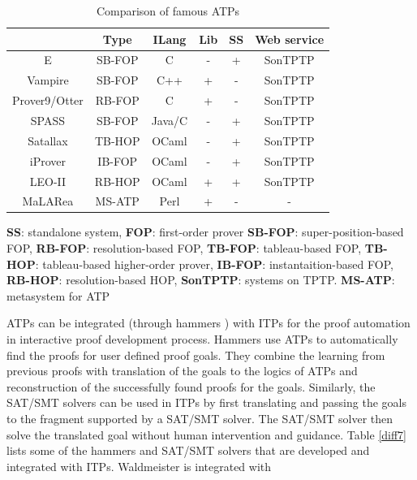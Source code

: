 \begin{table}[!ht]
 \centering
 \begin{threeparttable}
  \caption{Comparison of famous ATPs}\label{diff6}
  \begin{tabular}{|c|c|c|c|c|c|}
    \hline
    {\bf } & {\bf Type} & {\bf ILang} & {\bf Lib} & {\bf SS} & {\bf Web service}\\ \hline
     E & SB-FOP & C & - & + & SonTPTP\\ \hline
     Vampire & SB-FOP & C++ & + & - & SonTPTP\\ \hline    
     Prover9/Otter & RB-FOP & C & + & - & SonTPTP\\ \hline     
     SPASS & SB-FOP & Java/C & - & + & SonTPTP\\ \hline 
     Satallax & TB-HOP  & OCaml & - & + & SonTPTP \\ \hline 
     iProver & IB-FOP & OCaml & - & + & SonTPTP \\ \hline 
     LEO-II & RB-HOP & OCaml & + & + & SonTPTP \\ \hline 
     MaLARea & MS-ATP & Perl & + & - & - \\ \hline 
     \end{tabular}
\begin{tablenotes}
\item 
{\bf SS}: standalone system, {\bf FOP}: first-order prover 
 {\bf SB-FOP}: super-position-based FOP, {\bf RB-FOP}: resolution-based FOP, {\bf TB-FOP}: tableau-based FOP, {\bf TB-HOP}: tableau-based higher-order prover, 
 {\bf IB-FOP}: instantaition-based FOP, {\bf RB-HOP}: resolution-based HOP, {\bf SonTPTP}: systems on TPTP. {\bf MS-ATP}: metasystem for ATP
\end{tablenotes}
\end{threeparttable}
\end{table}
ATPs can be integrated (through hammers ) with ITPs for the proof automation in interactive proof development process. 
Hammers use ATPs to automatically find the proofs for user defined proof goals.
They combine the learning from previous proofs with translation of the goals to the logics of ATPs and reconstruction of the successfully found
proofs for the goals. Similarly, the SAT/SMT solvers can be used in ITPs by first translating and passing the goals to the fragment supported by a SAT/SMT solver. 
The SAT/SMT solver then solve the translated goal without human intervention and guidance. Table \ref{diff7} lists some of the hammers and SAT/SMT solvers that 
are developed and integrated with ITPs. Waldmeister  is integrated with 
